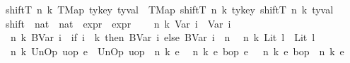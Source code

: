 \begin{isabellebody}
{\isacharbar}{\kern0pt}\ {\isachardoublequoteopen}shiftT\ n\ k\ {\isacharparenleft}{\kern0pt}TMap\ ty{\isacharunderscore}{\kern0pt}key\ ty{\isacharunderscore}{\kern0pt}val{\isacharparenright}{\kern0pt}\ {\isacharequal}{\kern0pt}\ {\isacharparenleft}{\kern0pt}TMap\ {\isacharparenleft}{\kern0pt}{\isacharparenleft}{\kern0pt}shiftT\ n\ k{\isacharparenright}{\kern0pt}\ ty{\isacharunderscore}{\kern0pt}key{\isacharparenright}{\kern0pt}\ {\isacharparenleft}{\kern0pt}shiftT\ n\ k\ ty{\isacharunderscore}{\kern0pt}val{\isacharparenright}{\kern0pt}{\isacharparenright}{\kern0pt}{\isachardoublequoteclose}\isanewline
\isanewline
{}\isamarkupfalse%
\ shift\ {\isacharcolon}{\kern0pt}{\isacharcolon}{\kern0pt}\ {\isachardoublequoteopen}nat\ {\isasymRightarrow}\ nat\ {\isasymRightarrow}\ expr\ {\isasymRightarrow}\ expr{\isachardoublequoteclose}\ {\isacharparenleft}{\kern0pt}{\isachardoublequoteopen}{\isasymup}{\isachardoublequoteclose}{\isacharparenright}{\kern0pt}\isanewline
{}\isanewline
\ \ {\isachardoublequoteopen}{\isasymup}\ n\ k\ {\isacharparenleft}{\kern0pt}Var\ i{\isacharparenright}{\kern0pt}\ {\isacharequal}{\kern0pt}\ Var\ i{\isachardoublequoteclose}\isanewline
{\isacharbar}{\kern0pt}\ {\isachardoublequoteopen}{\isasymup}\ n\ k\ {\isacharparenleft}{\kern0pt}BVar\ i{\isacharparenright}{\kern0pt}\ {\isacharequal}{\kern0pt}\ {\isacharparenleft}{\kern0pt}if\ i\ {\isacharless}{\kern0pt}\ k\ then\ BVar\ i\ else\ BVar\ {\isacharparenleft}{\kern0pt}i\ {\isacharplus}{\kern0pt}\ n{\isacharparenright}{\kern0pt}{\isacharparenright}{\kern0pt}{\isachardoublequoteclose}\isanewline
{\isacharbar}{\kern0pt}\ {\isachardoublequoteopen}{\isasymup}\ n\ k\ {\isacharparenleft}{\kern0pt}Lit\ l{\isacharparenright}{\kern0pt}\ {\isacharequal}{\kern0pt}\ {\isacharparenleft}{\kern0pt}Lit\ l{\isacharparenright}{\kern0pt}{\isachardoublequoteclose}\isanewline
{\isacharbar}{\kern0pt}\ {\isachardoublequoteopen}{\isasymup}\ n\ k\ {\isacharparenleft}{\kern0pt}UnOp\ uop\ e{\isacharparenright}{\kern0pt}\ {\isacharequal}{\kern0pt}\ UnOp\ uop\ {\isacharparenleft}{\kern0pt}{\isasymup}\ n\ k\ e{\isacharparenright}{\kern0pt}{\isachardoublequoteclose}\isanewline
{\isacharbar}{\kern0pt}\ {\isachardoublequoteopen}{\isasymup}\ n\ k\ {\isacharparenleft}{\kern0pt}e{}\ {\isasymguillemotleft}bop{\isasymguillemotright}\ e{}{\isacharparenright}{\kern0pt}\ {\isacharequal}{\kern0pt}\ {\isacharparenleft}{\kern0pt}{\isasymup}\ n\ k\ e{}{\isacharparenright}{\kern0pt}\ {\isasymguillemotleft}bop{\isasymguillemotright}\ {\isacharparenleft}{\kern0pt}{\isasymup}\ n\ k\ e{}{\isacharparenright}{\kern0pt}{\isachardoublequoteclose}\isanewline

\end{isabellebody}
